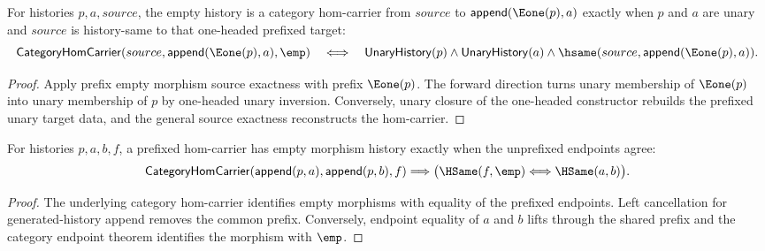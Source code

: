 \begin{theorem}
\label{thm:functor-prefix-e1-empty-morphism-source-iff}
For histories $p,a,source$, the empty history is a category hom-carrier from
$source$ to $\mathsf{append}(\Eone(p),a)$ exactly when $p$ and $a$ are unary and
$source$ is history-same to that one-headed prefixed target:
$$
\mathsf{CategoryHomCarrier}(source,\mathsf{append}(\Eone(p),a),\emp)
\quad\Longleftrightarrow\quad
\mathsf{UnaryHistory}(p)\wedge\mathsf{UnaryHistory}(a)\wedge
\hsame(source,\mathsf{append}(\Eone(p),a)).
$$
\end{theorem}
\begin{proof}
Apply prefix empty morphism source exactness with prefix $\Eone(p)$. The
forward direction turns unary membership of $\Eone(p)$ into unary membership
of $p$ by one-headed unary inversion. Conversely, unary closure of the
one-headed constructor rebuilds the prefixed unary target data, and the
general source exactness reconstructs the hom-carrier.
\end{proof}

\begin{theorem}
\label{thm:functor-prefix-hom-carrier-morphism-empty-endpoint-iff}
For histories $p,a,b,f$, a prefixed hom-carrier has empty morphism history
exactly when the unprefixed endpoints agree:
$$
\mathsf{CategoryHomCarrier}(\mathsf{append}(p,a),\mathsf{append}(p,b),f)
\Longrightarrow
\bigl(\HSame(f,\emp)\Longleftrightarrow\HSame(a,b)\bigr).
$$
\end{theorem}
\begin{proof}
The underlying category hom-carrier identifies empty morphisms with equality
of the prefixed endpoints. Left cancellation for generated-history append
removes the common prefix. Conversely, endpoint equality of $a$ and $b$
lifts through the shared prefix and the category endpoint theorem identifies
the morphism with $\emp$.
\end{proof}

